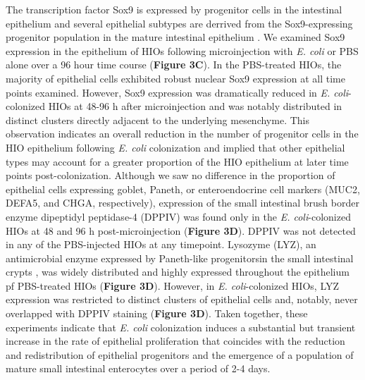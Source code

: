 \documentclass[9pt,lineo]{elife}
\begin{document}
The transcription factor Sox9 is expressed by progenitor cells in the intestinal epithelium \citep{Bastide:2007,Mori-Akiyama:2007} and several epithelial subtypes are derrived from the Sox9-expressing progenitor population in the mature intestinal epithelium \citep{Bastide:2007,Furuyama:2011}. We examined Sox9 expression in the epithelium of HIOs following microinjection with \emph{E. coli} or PBS alone over a 96 hour time course (\textbf{Figure 3C}). In the PBS-treated HIOs, the majority of epithelial cells exhibited robust nuclear Sox9 expression at all time points examined. However, Sox9 expression was dramatically reduced in \emph{E. coli}-colonized HIOs at 48-96 h after microinjection and was notably distributed in distinct clusters directly adjacent to the underlying mesenchyme. This observation indicates an overall reduction in the number of progenitor cells in the HIO epithelium following \emph{E. coli} colonization and implied that other epithelial types may account for a greater proportion of the HIO epithelium at later time points post-colonization. Although we saw no difference in the proportion of epithelial cells expressing goblet, Paneth, or enteroendocrine cell markers (MUC2, DEFA5, and CHGA, respectively), expression of the small intestinal brush border enzyme dipeptidyl peptidase-4 (DPPIV) was found only in the \emph{E. coli}-colonized HIOs at 48 and 96 h post-microinjection (\textbf{Figure 3D}). DPPIV was not detected in any of the PBS-injected HIOs at any timepoint. Lysozyme (LYZ), an antimicrobial enzyme expressed by Paneth-like progenitorsin the small intestinal crypts \cite{Bevins:2011}, was widely distributed and highly expressed throughout the epithelium pf PBS-treated HIOs (\textbf{Figure 3D}). However, in \emph{E. coli}-colonized HIOs, LYZ expression was restricted to distinct clusters of epithelial cells and, notably, never overlapped with DPPIV staining (\textbf{Figure 3D}). Taken together, these experiments indicate that \emph{E. coli} colonization induces a substantial but transient increase in the rate of epithelial proliferation that coincides with the reduction and redistribution of epithelial progenitors and the emergence of a population of mature small intestinal enterocytes over a period of 2-4 days.
\end{document}
